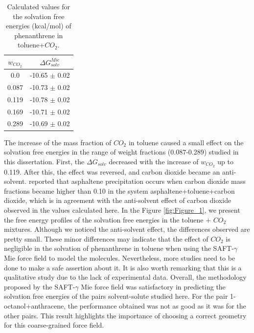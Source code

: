 \documentclass[
	12pt,				%
	openany,			%
	oneside,			%
	a4paper,			%
	english,			%
	brazil				%
	]{abntex2}
\begin{document}
\FloatBarrier
\begin{table}[H]
	\centering
	\caption{Calculated values for the solvation free energies (kcal/mol) of phenanthrene in toluene+$CO_{2}$.}
	\label{tbl:solvco2}
	\begin{tabular}{cc}
		\hline
		\hline
		$w_{CO_{2}}$ & $\Delta G_{solv}^{Mie}$ \\
		\hline\hline
		0.0    & -10.65 $\pm$ 0.02   \\
		0.087  & -10.73 $\pm$ 0.02   \\
		0.119  & -10.78 $\pm$ 0.02   \\
		0.169  & -10.71 $\pm$ 0.02   \\
		0.289  & -10.69 $\pm$ 0.02   \\
		\hline
		\hline
	\end{tabular}
\end{table}
\FloatBarrier

The increase of the mass fraction of $CO_{2}$ in toluene caused a small effect on the solvation free energies in the range of weight fractions (0.087-0.289) studied in this dissertation. First, the $\Delta G_{solv}$ decreased with the increase of $w_{CO_{2}}$ up to 0.119. After this, the effect was reversed, and carbon dioxide became an anti-solvent.  reported that asphaltene precipitation occurs when carbon dioxide mass fractions became higher than 0.10 in the system asphaltene+toluene+carbon dioxide, which is in agreement with the anti-solvent effect of carbon dioxide observed in the values calculated here. In the Figure \ref{fig:Figure_1}, we present the free energy profiles of the solvation free energies in the toluene + $CO_{2}$ mixtures. Although we noticed the anti-solvent effect, the differences observed are pretty small. These minor differences may indicate that the effect of $CO_{2}$ is negligible in the solvation of phenanthrene in toluene when using the SAFT-$\gamma$ Mie force field to model the molecules. Nevertheless, more studies need to be done to make a safe assertion about it. It is also worth remarking that this is a qualitative study due to the lack of experimental data. Overall, the methodology proposed by the SAFT-$\gamma$ Mie force field was satisfactory in predicting the solvation free energies of the pairs solvent-solute studied here. For the pair 1-octanol+anthracene, the performance obtained was not as good as it was for the other pairs. This result highlights the importance of choosing a correct geometry for this coarse-grained force field.    
\end{document}
